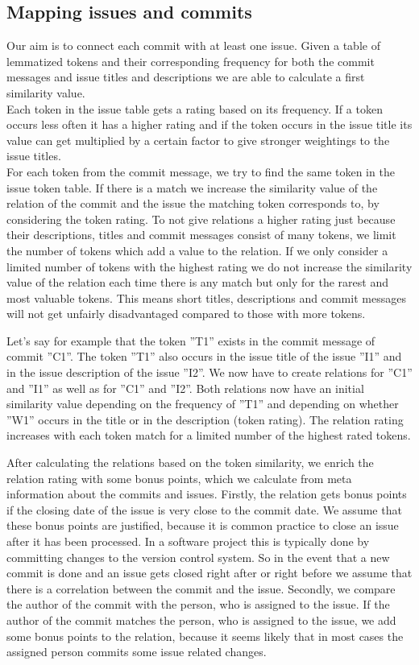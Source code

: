 \subsection{Mapping issues and commits}

Our aim is to connect each commit with at least one issue.
Given a table of lemmatized tokens and their corresponding frequency for both the commit messages and issue titles and descriptions we are able to calculate a first similarity value.\\
Each token in the issue table gets a rating based on its frequency.
If a token occurs less often it has a higher rating and if the token occurs in the issue title its value can get multiplied by a certain factor to give stronger weightings to the issue titles.\\
For each token from the commit message, we try to find the same token in the issue token table.
If there is a match we increase the similarity value of the relation of the commit and the issue the matching token corresponds to, by considering the token rating.
To not give relations a higher rating just because their descriptions, titles and commit messages consist of many tokens, we limit the number of tokens which add a value to the relation.
If we only consider a limited number of tokens with the highest rating we do not increase the similarity value of the relation each time there is any match but only for the rarest and most valuable tokens.
This means short titles, descriptions and commit messages will not get unfairly disadvantaged compared to those with more tokens.

Let's say for example that the token ''T1'' exists in the commit message of commit ''C1''.
The token ''T1'' also occurs in the issue title of the issue ''I1'' and in the issue description of the issue ''I2''.
We now have to create relations for ''C1'' and ''I1'' as well as for ''C1'' and ''I2''.
Both relations now have an initial similarity value depending on the frequency of ''T1'' and depending on whether ''W1'' occurs in the title or in the description (token rating).
The relation rating increases with each token match for a limited number of the highest rated tokens.

After calculating the relations based on the token similarity, we enrich the relation rating with some bonus points, which we calculate from meta information about the commits and issues.
Firstly, the relation gets bonus points if the closing date of the issue is very close to the commit date.
We assume that these bonus points are justified, because it is common practice to close an issue after it has been processed.
In a software project this is typically done by committing changes to the version control system.
So in the event that a new commit is done and an issue gets closed right after or right before we assume that there is a correlation between the commit and the issue.
Secondly, we compare the author of the commit with the person, who is assigned to the issue.
If the author of the commit matches the person, who is assigned to the issue, we add some bonus points to the relation, because it seems likely that in most cases the assigned person commits some issue related changes.

